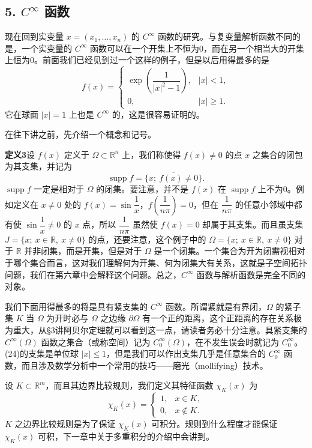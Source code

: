 \subsection*{5. $C^\infty$ 函数}

现在回到实变量 $x=(x_1,\ldots,x_n)$ 的 $C^\infty$ 函数的研究。与复变量解析函数不同的是，一个实变量的 $C^\infty$ 函数可以在一个开集上不恒为0，而在另一个相当大的开集上恒为0。前面我们已经见到过一个这样的例子，但是以后用得最多的是
\begin{equation}
 f(x)=
 \begin{cases}
 \exp\!\left(\dfrac{1}{|x|^2-1}\right),& |x|<1,\\[4pt]
 0,& |x|\ge1.
 \end{cases}
 \tag{24}
\end{equation}
它在球面 $|x|=1$ 上也是 $C^\infty$ 的，这是很容易证明的。

在往下讲之前，先介绍一个概念和记号。

\noindent\textbf{定义3}\quad 设 $f(x)$ 定义于 $\Omega\subset\mathbb R^n$ 上，我们称使得 $f(x)\ne0$ 的点 $x$ 之集合的闭包为其支集，并记为
\[
 \operatorname{supp}f=\overline{\{x;\ f(x)\ne0\}}.
\]
$\operatorname{supp}f$ 一定是相对于 $\Omega$ 的闭集。要注意，并不是 $f(x)$ 在 $\operatorname{supp}f$ 上不为0。例如定义在 $x\ne0$ 处的 $f(x)=\sin\dfrac1x$，$f\!\left(\dfrac1{n\pi}\right)=0$，但在 $\dfrac1{n\pi}$ 的任意小邻域中都有使 $\sin\dfrac1x\ne0$ 的 $x$ 点，所以 $\dfrac1{n\pi}$ 虽然使 $f(x)=0$ 却属于其支集。而且虽支集 $J=\{x;\ x\in\mathbb R,\ x\ne0\}$ 的点，还要注意，这个例子中的 $\Omega=\{x;\ x\in\mathbb R,\ x\ne0\}$ 对于 $\mathbb R$ 并非闭集，而是开集，但是对于 $\Omega$ 是一个闭集。一个集合为开为闭需视相对于哪个集合而言，这对我们理解何为开集、何为闭集大有关系，这就是子空间拓扑问题，我们在第六章中会解释这个问题。总之，$C^\infty$ 函数与解析函数是完全不同的对象。

我们下面用得最多的将是具有紧支集的 $C^\infty$ 函数。所谓紧就是有界闭，$\Omega$ 的紧子集 $K$ 当 $\Omega$ 为开时必与 $\Omega$ 之边缘 $\partial\Omega$ 有一个正的距离，这个正距离的存在关系极为重大，从§3讲阿贝尔定理就可以看到这一点，请读者务必十分注意。具紧支集的 $C^\infty(\Omega)$ 函数之集合（或称空间）记为 $C_0^\infty(\Omega)$，在不发生误会时就记为 $C_0^\infty$。(24)的支集是单位球 $|x|\le1$，但是我们可以作出支集几乎是任意集合的 $C_0^\infty$ 函数，而且涉及数学分析中一个常用的技巧——磨光（mollifying）技术。

设 $K\subset\mathbb R^m$，而且其边界比较规则，我们定义其特征函数 $\chi_K(x)$ 为
\begin{equation}
 \chi_K(x)=
 \begin{cases}
 1,&x\in K,\\
 0,&x\notin K.
 \end{cases}
 \tag{25}
\end{equation}
$K$ 之边界比较规则是为了保证 $\chi_K(x)$ 可积分。规则到什么程度才能保证 $\chi_K(x)$ 可积，下一章中关于多重积分的介绍中会讲到。


